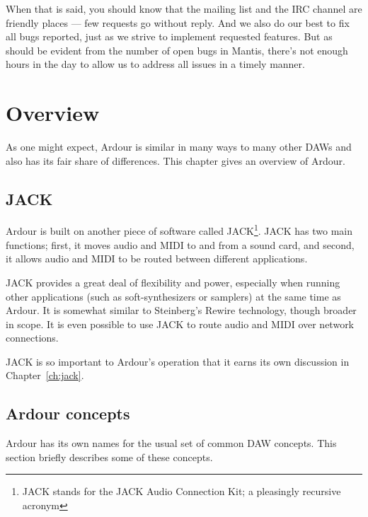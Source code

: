 \documentclass[10pt,a4paper]{book}
\begin{document}
When that is said, you should know that the mailing list and the IRC
channel are friendly places --- few requests go without reply. And we
also do our best to fix all bugs reported, just as we strive to
implement requested features. But as should be evident from the number
of open bugs in Mantis, there's not enough hours in the day to allow
us to address all issues in a timely manner.






\chapter{Overview}

As one might expect, Ardour is similar in many ways to many other DAWs
and also has its fair share of differences.  This chapter gives an
overview of Ardour.


\section{JACK}

Ardour is built on another piece of software called JACK\footnote{JACK
  stands for the JACK Audio Connection Kit; a pleasingly recursive acronym}.
JACK has two main functions; first, it moves audio and MIDI to
and from a sound card, and second, it allows audio and MIDI to be
routed between different applications.

JACK provides a great deal of flexibility and power, especially when
running other applications (such as soft-synthesizers or samplers) at
the same time as Ardour.  It is somewhat similar to Steinberg's Rewire
technology, though broader in scope.  It is even possible to use JACK
to route audio and MIDI over network connections.

JACK is so important to Ardour's operation that it earns its own
discussion in Chapter~\ref{ch:jack}.


\section{Ardour concepts}

Ardour has its own names for the usual set of common DAW concepts.
This section briefly describes some of these concepts.
\end{document}
